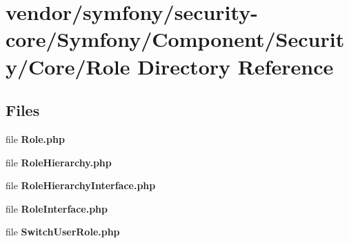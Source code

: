 \section{vendor/symfony/security-\/core/\+Symfony/\+Component/\+Security/\+Core/\+Role Directory Reference}
\label{dir_faf194870168077dbe2306bc802b94a8}
\subsection*{Files}
\begin{DoxyCompactItemize}
\item 
file {\bf Role.\+php}
\item 
file {\bf Role\+Hierarchy.\+php}
\item 
file {\bf Role\+Hierarchy\+Interface.\+php}
\item 
file {\bf Role\+Interface.\+php}
\item 
file {\bf Switch\+User\+Role.\+php}
\end{DoxyCompactItemize}
